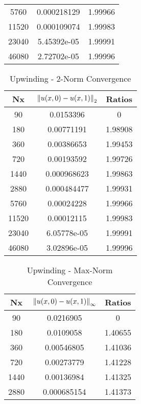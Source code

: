 \documentclass[12pt]{article}
\begin{document}
\begin{enumerate}[(a)]
\begin{minipage}{0.5\textwidth}
\begin{table}[H]
\begin{tabular}{||c|cc||}
  5760 &    0.000218129 &  1.99966 \\
 11520 &    0.000109074 &  1.99983 \\
 23040 &    5.45392e-05 &  1.99991 \\
 46080 &    2.72702e-05 &  1.99996 \\
\hline \hline
\end{tabular}
\end{table}
\end{minipage}%
\begin{minipage}{0.5\textwidth}
\begin{table}[H]
\caption{Upwinding - 2-Norm Convergence}
\centering\begin{tabular}{||c|cc||}
\hline \hline
    Nx &   $\norm{u(x,0)-u(x,1)}_2$ &   Ratios \\
\hline
    90 &    0.0153396   &  0       \\
   180 &    0.00771191  &  1.98908 \\
   360 &    0.00386653  &  1.99453 \\
   720 &    0.00193592  &  1.99726 \\
  1440 &    0.000968623 &  1.99863 \\
  2880 &    0.000484477 &  1.99931 \\
  5760 &    0.00024228  &  1.99966 \\
 11520 &    0.00012115  &  1.99983 \\
 23040 &    6.05778e-05 &  1.99991 \\
 46080 &    3.02896e-05 &  1.99996 \\
\hline \hline
\end{tabular}
\end{table}
\end{minipage}
\begin{minipage}{0.5\textwidth}
\begin{table}[H]
\caption{Upwinding - Max-Norm Convergence}
\centering\begin{tabular}{||c|cc||}
\hline \hline
    Nx &   $\norm{u(x,0)-u(x,1)}_\infty$ &   Ratios \\
\hline
    90 &      0.0216905   &  0       \\
   180 &      0.0109058   &  1.40655 \\
   360 &      0.00546805  &  1.41036 \\
   720 &      0.00273779  &  1.41228 \\
  1440 &      0.00136984  &  1.41325 \\
  2880 &      0.000685154 &  1.41373 \\

\end{tabular}
\end{table}
\end{minipage}
\end{enumerate}
\end{document}
